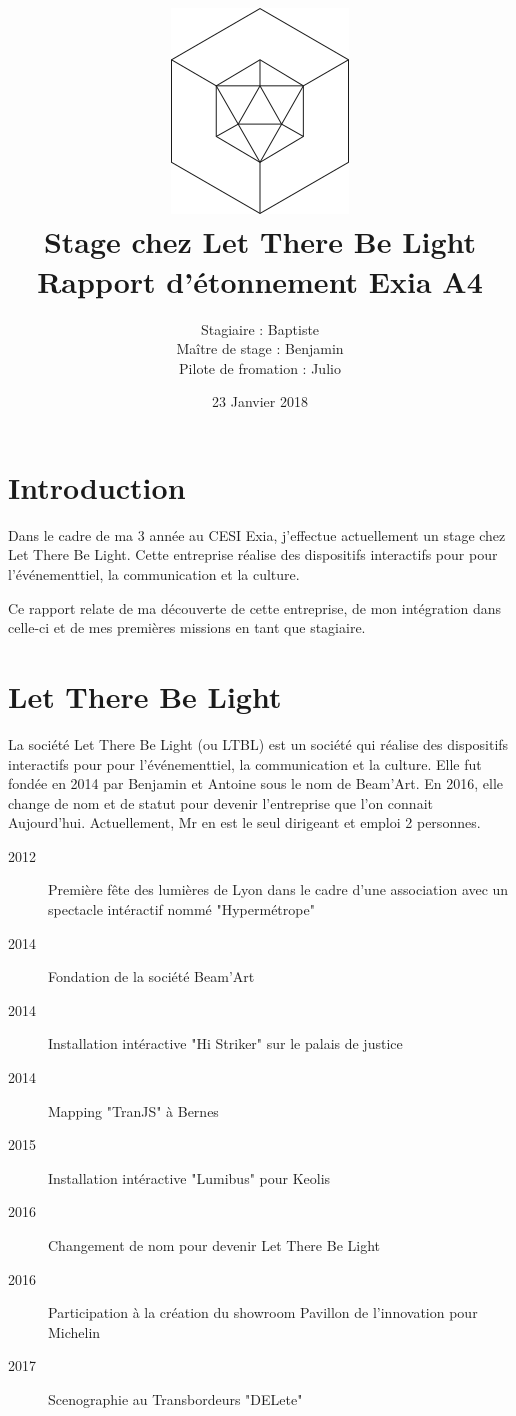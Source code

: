 \documentclass{article}
\title{\includegraphics{logo.png}\vspace{2cm}\\Stage chez Let There Be Light \\ \large Rapport d'étonnement Exia A4}
\date{23 Janvier 2018}
\author{Stagiaire : Baptiste \bsc{Saclier} \\ Maître de stage : Benjamin \basc{Petit}\\Pilote de fromation : Julio \basc{Santilario}}
\begin{document}
\maketitle

\clearpage

\tableofcontents

\section{Introduction}

Dans le cadre de ma 3 année au CESI Exia, j'effectue actuellement un stage chez Let There Be Light.
Cette entreprise réalise des dispositifs interactifs pour pour l'événementtiel, la communication et la culture.

Ce rapport relate de ma découverte de cette entreprise, de mon intégration dans celle-ci et de mes premières missions en tant que stagiaire.

\clearpage

\section{Let There Be Light}

La société Let There Be Light (ou LTBL) est un société qui réalise des dispositifs interactifs pour pour l'événementtiel, la communication et la culture.
Elle fut fondée en 2014 par Benjamin  et Antoine  sous le nom de Beam'Art.
En 2016, elle change de nom et de statut pour devenir l'entreprise que l'on connait Aujourd'hui.
Actuellement, Mr  en est le seul dirigeant et emploi 2 personnes.

\begin{description}
    \item[2012] Première fête des lumières de Lyon dans le cadre d'une association avec un spectacle intéractif nommé "Hypermétrope"
    \item[2014] Fondation de la société Beam'Art
    \item[2014] Installation intéractive "Hi Striker" sur le palais de justice
    \item[2014] Mapping "TranJS" à Bernes
    \item[2015] Installation intéractive "Lumibus" pour Keolis
    \item[2016] Changement de nom pour devenir Let There Be Light
    \item[2016] Participation à la création du showroom Pavillon de l'innovation pour Michelin
    \item[2017] Scenographie au Transbordeurs "DELete"
\end{description}
\end{document}
